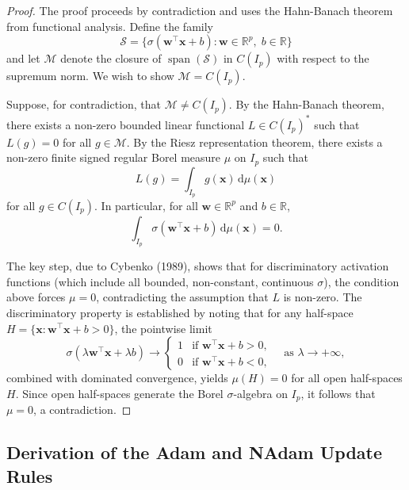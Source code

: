 \begin{proof}
The proof proceeds by contradiction and uses the Hahn-Banach theorem from functional analysis. Define the family
\[
  \mathcal{S} = \bigl\{ \sigma(\mathbf{w}^\top \mathbf{x} + b) : \mathbf{w} \in \mathbb{R}^p,\; b \in \mathbb{R} \bigr\}
\]
and let $\mathcal{M}$ denote the closure of $\operatorname{span}(\mathcal{S})$ in $C(I_p)$ with respect to the supremum norm. We wish to show $\mathcal{M} = C(I_p)$.

Suppose, for contradiction, that $\mathcal{M} \neq C(I_p)$. By the Hahn-Banach theorem, there exists a non-zero bounded linear functional $L \in C(I_p)^*$ such that $L(g) = 0$ for all $g \in \mathcal{M}$. By the Riesz representation theorem, there exists a non-zero finite signed regular Borel measure $\mu$ on $I_p$ such that
\[
  L(g) = \int_{I_p} g(\mathbf{x}) \, \mathrm{d}\mu(\mathbf{x})
\]
for all $g \in C(I_p)$. In particular, for all $\mathbf{w} \in \mathbb{R}^p$ and $b \in \mathbb{R}$,
\[
  \int_{I_p} \sigma(\mathbf{w}^\top \mathbf{x} + b) \, \mathrm{d}\mu(\mathbf{x}) = 0.
\]

The key step, due to Cybenko (1989), shows that for discriminatory activation functions (which include all bounded, non-constant, continuous $\sigma$), the condition above forces $\mu = 0$, contradicting the assumption that $L$ is non-zero. The discriminatory property is established by noting that for any half-space $H = \{\mathbf{x} : \mathbf{w}^\top \mathbf{x} + b > 0\}$, the pointwise limit
\[
  \sigma(\lambda \mathbf{w}^\top \mathbf{x} + \lambda b) \to
  \begin{cases}
    1 & \text{if } \mathbf{w}^\top \mathbf{x} + b > 0, \\
    0 & \text{if } \mathbf{w}^\top \mathbf{x} + b < 0,
  \end{cases}
  \quad \text{as } \lambda \to +\infty,
\]
combined with dominated convergence, yields $\mu(H) = 0$ for all open half-spaces $H$. Since open half-spaces generate the Borel $\sigma$-algebra on $I_p$, it follows that $\mu = 0$, a contradiction.
\end{proof}

\subsection{Derivation of the Adam and NAdam Update Rules}
\label{annexure:adam_nadam}

